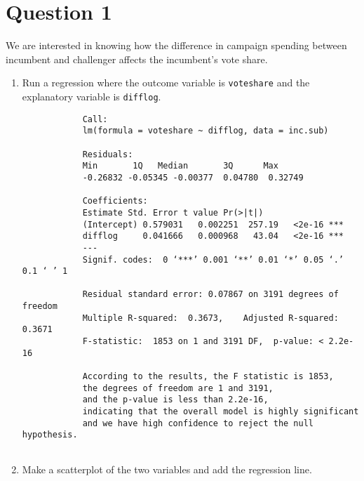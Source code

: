 \documentclass[12pt,letterpaper]{article}
\begin{document}
\section*{Question 1}
\vspace{.25cm}
\noindent We are interested in knowing how the difference in campaign spending between incumbent and challenger affects the incumbent's vote share. 
	\begin{enumerate}
		\item Run a regression where the outcome variable is \texttt{voteshare} and the explanatory variable is \texttt{difflog}.\\
		
		\vspace{.15cm}
        

		\vspace{.15cm}
		
		\begin{footnotesize}
			
			\begin{verbatim}
			Call:
			lm(formula = voteshare ~ difflog, data = inc.sub)
			
			Residuals:
			Min       1Q   Median       3Q      Max 
			-0.26832 -0.05345 -0.00377  0.04780  0.32749 
			
			Coefficients:
			Estimate Std. Error t value Pr(>|t|)    
			(Intercept) 0.579031   0.002251  257.19   <2e-16 ***
			difflog     0.041666   0.000968   43.04   <2e-16 ***
			---
			Signif. codes:  0 ‘***’ 0.001 ‘**’ 0.01 ‘*’ 0.05 ‘.’ 0.1 ‘ ’ 1
			
			Residual standard error: 0.07867 on 3191 degrees of freedom
			Multiple R-squared:  0.3673,	Adjusted R-squared:  0.3671 
			F-statistic:  1853 on 1 and 3191 DF,  p-value: < 2.2e-16
			
			According to the results, the F statistic is 1853, 
			the degrees of freedom are 1 and 3191,
			and the p-value is less than 2.2e-16,
			indicating that the overall model is highly significant 
			and we have high confidence to reject the null hypothesis.
		
			\end{verbatim}
		\end{footnotesize}
		\noindent 
		\item Make a scatterplot of the two variables and add the regression line. 		
		\vspace{.15cm}
		 
		\vspace{.15cm}
		\begin{figure}[h!]\centering
			

\end{figure}
\end{enumerate}
\end{document}
